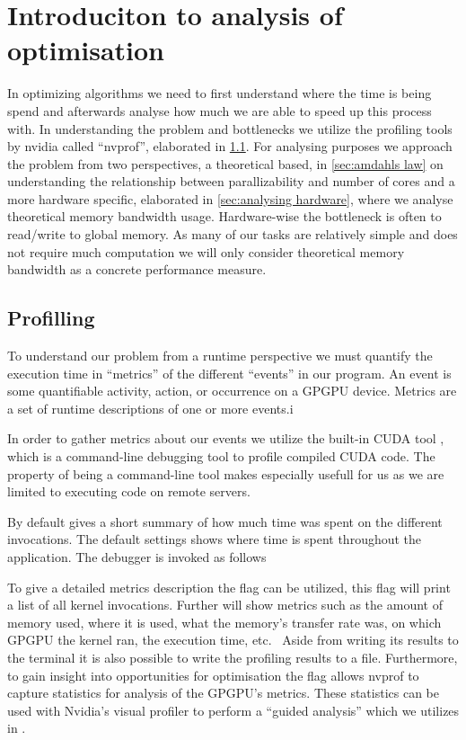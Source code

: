 \section{Introduciton to analysis of optimisation}
\label{sec:introduction to analysis of optimisation}
In optimizing algorithms we need to first understand where the time is being spend and afterwards analyse how much we are able to speed up this process with.
In understanding the problem and bottlenecks we utilize the profiling tools by nvidia called ``nvprof'', elaborated in \cref{sec:profiling}.
For analysing purposes we approach the problem from two perspectives, a theoretical based, in \cref{sec:amdahls law} on understanding the relationship between parallizability and number of cores and a more hardware specific, elaborated in \cref{sec:analysing hardware}, where we analyse theoretical memory bandwidth usage.
Hardware-wise the bottleneck is often to read/write to global memory.
As many of our tasks are relatively simple and does not require much computation we will only consider theoretical memory bandwidth as a concrete performance measure.

\subsection{Profilling}
\label{sec:profiling}
To understand our problem from a runtime perspective we must quantify the execution time in ``metrics'' of the different ``events'' in our program.
An event is some quantifiable activity, action, or occurrence on a GPGPU device.
Metrics are a set of runtime descriptions of one or more events.i

In order to gather metrics about our events we utilize the built-in CUDA tool , which is a command-line debugging tool to profile compiled CUDA code.
The property of being a command-line tool makes  especially usefull for us as we are limited to executing code on remote servers.

By default  gives a short summary of how much time was spent on the different invocations.
The default settings shows where time is spent throughout the application.
The debugger is invoked as follows
%
\begin{quote}
\end{quote}
%
To give a detailed metrics description the flag  can be utilized, this flag will print a list of all kernel invocations.
Further  will show metrics such as the amount of memory used, where it is used, what the memory's transfer rate was, on which GPGPU the kernel ran, the execution time, etc.~\cite{profiling2015doc}
Aside from writing its results to the terminal it is also possible to write the profiling results to a file.
Furthermore, to gain insight into opportunities for optimisation the  flag allows nvprof to capture statistics for analysis of the GPGPU's metrics.
These statistics can be used with Nvidia's visual profiler to perform a ``guided analysis'' which we utilizes in .~\cite{nvprof2013tips}


